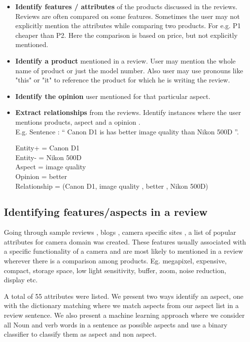 \documentclass[12pt]{article}
\begin{document}
\begin{itemize}
\item \textbf{Identify features / attributes } of the products discussed in the reviews.   Reviews are often compared on some features. Sometimes the user may not explicitly mention the attributes while comparing two products. For e.g.  P1 cheaper than P2. Here the comparison is based on price, but not explicitly mentioned.

\item \textbf{Identify a product} mentioned in a review. User may mention the whole name of product or just the model number. Also user may use pronouns like "this" or "it" to reference the product for which he is writing the review. 

\item \textbf{Identify the opinion} user mentioned for that particular aspect.

\item \textbf{Extract relationships} from the reviews. Identify instances where the user mentions products, aspect and a opinion .\\ 
 E.g.    Sentence : “ Canon D1 is has better image quality than Nikon 500D ”.

   Entity+ = Canon D1 \\
   Entity- = Nikon 500D \\
   Aspect = image quality\\
   Opinion = better \\Relationship = (Canon D1,  image quality , better , Nikon 500D)\\
\end{itemize}


\subsection{Identifying features/aspects in a review}
  Going through sample reviews , blogs , camera specific sites , a list of popular   attributes for camera domain  was created. These features usually associated with a specific functionality of a camera and are most likely to mentioned in a review wherever there is a comparison among products. Eg. megapixel, expensive, compact, storage space, low light sensitivity, buffer, zoom, noise reduction, display etc.

A total of 55 attributes were listed. We present two ways identify an aspect, one with the dictionary matching where we match aspects from our aspect list in a review sentence. We also present a machine learning approach where we consider all Noun and verb words in a sentence as possible aspects and use a binary classifier to classify them as aspect and non aspect.
\end{document}
